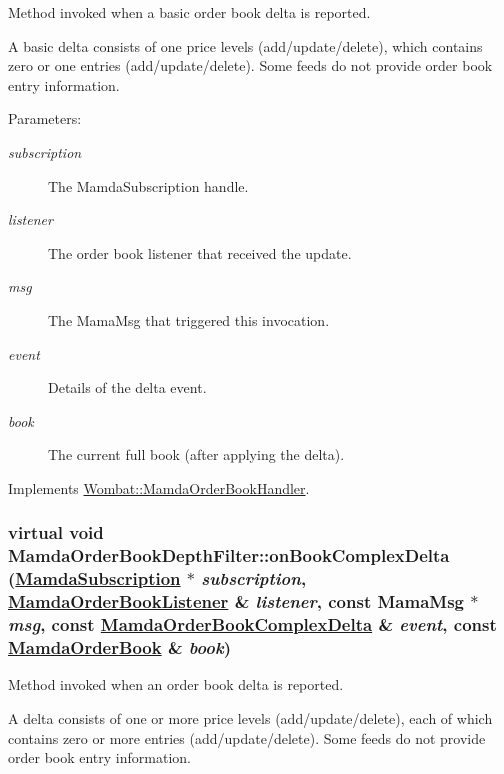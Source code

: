 Method invoked when a basic order book delta is reported. 

A basic delta consists of one price levels (add/update/delete), which contains zero or one entries (add/update/delete). Some feeds do not provide order book entry information.

\begin{Desc}
\item[Parameters:]
\begin{description}
\item[{\em subscription}]The Mamda\-Subscription handle. \item[{\em listener}]The order book listener that received the update. \item[{\em msg}]The Mama\-Msg that triggered this invocation. \item[{\em event}]Details of the delta event. \item[{\em book}]The current full book (after applying the delta). \end{description}
\end{Desc}


Implements \hyperlink{classWombat_1_1MamdaOrderBookHandler_b24be779d6029bfcc87ad85f469aa89f}{Wombat::Mamda\-Order\-Book\-Handler}.\hypertarget{classMamdaOrderBookDepthFilter_1816fe7b1f93ae44a94127c8995f7a26}{
\subsubsection[onBookComplexDelta]{\setlength{\rightskip}{0pt plus 5cm}virtual void Mamda\-Order\-Book\-Depth\-Filter::on\-Book\-Complex\-Delta (\hyperlink{classWombat_1_1MamdaSubscription}{Mamda\-Subscription} $\ast$ {\em subscription}, \hyperlink{classWombat_1_1MamdaOrderBookListener}{Mamda\-Order\-Book\-Listener} \& {\em listener}, const Mama\-Msg $\ast$ {\em msg}, const \hyperlink{classWombat_1_1MamdaOrderBookComplexDelta}{Mamda\-Order\-Book\-Complex\-Delta} \& {\em event}, const \hyperlink{classWombat_1_1MamdaOrderBook}{Mamda\-Order\-Book} \& {\em book})}}
\label{classMamdaOrderBookDepthFilter_1816fe7b1f93ae44a94127c8995f7a26}


Method invoked when an order book delta is reported. 

A delta consists of one or more price levels (add/update/delete), each of which contains zero or more entries (add/update/delete). Some feeds do not provide order book entry information.

